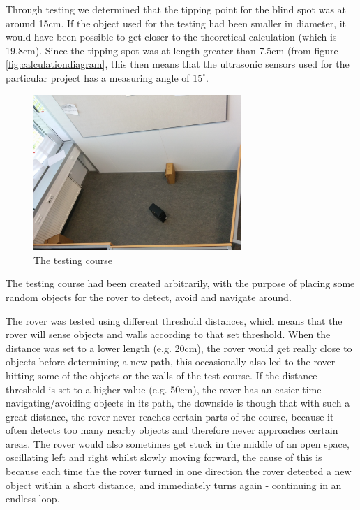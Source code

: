 Through testing we determined that the tipping point for the blind spot was at around 15cm. If the object used for the testing had been smaller in diameter, it would have been possible to get closer to the theoretical calculation (which is 19.8cm). Since the tipping spot was at length greater than 7.5cm (from figure \ref{fig:calculationdiagram}, this then means that the ultrasonic sensors used for the particular project has a measuring angle of $15^\circ$. 

\begin{figure}[H]
	\centering
	\includegraphics[width=0.7\textwidth]{images/testing-course.jpg}
	\caption{The testing course}
	\label{fig:testcourse}
\end{figure}

The testing course had been created arbitrarily, with the purpose of placing some random objects for the rover to detect, avoid and navigate around.

The rover was tested using different threshold distances, which means that the rover will sense objects and walls according to that set threshold. When the distance was set to a lower length (e.g. 20cm), the rover would get really close to objects before determining a new path, this occasionally also led to the rover hitting some of the objects or the walls of the test course. If the distance threshold is set to a higher value (e.g. 50cm), the rover has an easier time navigating/avoiding objects in its path, the downside is though that with such a great distance, the rover never reaches certain parts of the course, because it often detects too many nearby objects and therefore never approaches certain areas. The rover would also sometimes get stuck in the middle of an open space, oscillating  left and right whilst slowly moving forward, the cause of this is because each time the the rover turned in one direction the rover detected a new object within a short distance, and immediately turns again - continuing in an endless loop.

